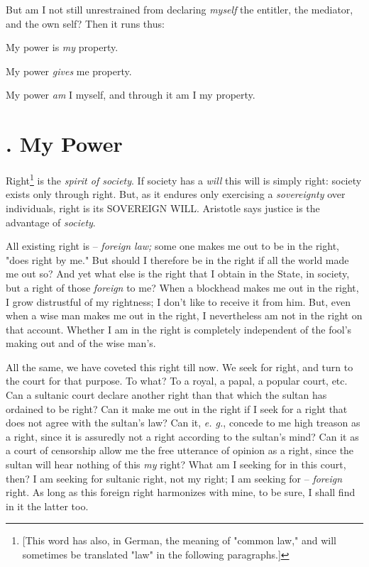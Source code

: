 But am I not still unrestrained from declaring \textit{myself} the entitler, 
the mediator, and the own self? Then it runs thus:

My power is \textit{my} property.

My power \textit{gives} me property.

My power \textit{am} I myself, and through it am I my property.

\section[1. My Power]{. My Power}

Right\footnote{[This word has also, in German, the meaning of "{}common 
law,"{} and will sometimes be translated "{}law"{} in the following 
paragraphs.]} is the \textit{spirit of society}. If society has a 
\textit{will} this will is simply right: society exists only through right. 
But, as it endures only exercising a \textit{sovereignty} over individuals, 
right is its SOVEREIGN WILL. Aristotle says justice is the advantage of 
\textit{society}.

All existing right is -- \textit{foreign law;} some one makes me out to be in 
the right, "{}does right by me."{} But should I therefore be in the right if 
all the world made me out so? And yet what else is the right that I obtain in 
the State, in society, but a right of those \textit{foreign} to me? When a 
blockhead makes me out in the right, I grow distrustful of my rightness; I 
don't like to receive it from him. But, even when a wise man makes me out in 
the right, I nevertheless am not in the right on that account. Whether I am in 
the right is completely independent of the fool's making out and of the wise 
man's.

All the same, we have coveted this right till now. We seek for right, and turn 
to the court for that purpose. To what? To a royal, a papal, a popular court, 
etc. Can a sultanic court declare another right than that which the sultan has 
ordained to be right? Can it make me out in the right if I seek for a right 
that does not agree with the sultan's law? Can it, \textit{e. g.}, concede to 
me high treason as a right, since it is assuredly not a right according to the 
sultan's mind? Can it as a court of censorship allow me the free utterance of 
opinion as a right, since the sultan will hear nothing of this \textit{my} 
right? What am I seeking for in this court, then? I am seeking for sultanic 
right, not my right; I am seeking for -- \textit{foreign} right. As long as 
this foreign right harmonizes with mine, to be sure, I shall find in it the 
latter too.

